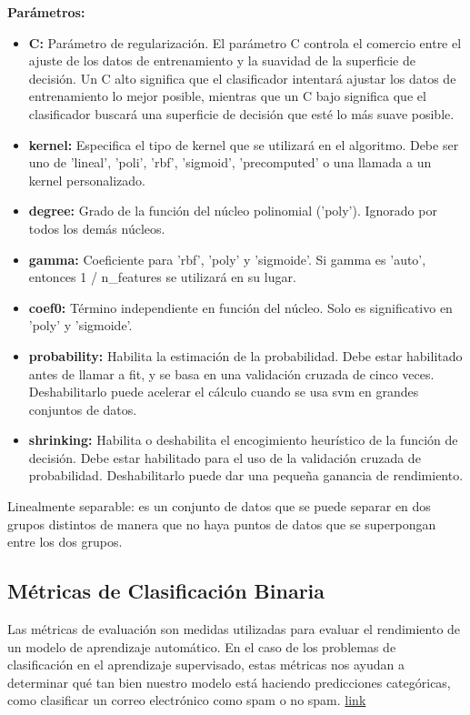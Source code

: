 \documentclass[../main.tex]{subfiles}
\begin{document}
            \textbf{Parámetros:}
            \begin{itemize}
                \item \textbf{C:} Parámetro de regularización. El parámetro C controla el comercio entre el ajuste de los datos de entrenamiento y la suavidad de la superficie de decisión. Un C alto significa que el clasificador intentará ajustar los datos de entrenamiento lo mejor posible, mientras que un C bajo significa que el clasificador buscará una superficie de decisión que esté lo más suave posible.
                \item \textbf{kernel:} Especifica el tipo de kernel que se utilizará en el algoritmo. Debe ser uno de 'lineal', 'poli', 'rbf', 'sigmoid', 'precomputed' o una llamada a un kernel personalizado.
                \item \textbf{degree:} Grado de la función del núcleo polinomial ('poly'). Ignorado por todos los demás núcleos.
                \item \textbf{gamma:} Coeficiente para 'rbf', 'poly' y 'sigmoide'. Si gamma es 'auto', entonces 1 / n\_features se utilizará en su lugar.
                \item \textbf{coef0:} Término independiente en función del núcleo. Solo es significativo en 'poly' y 'sigmoide'.
                \item \textbf{probability:} Habilita la estimación de la probabilidad. Debe estar habilitado antes de llamar a fit, y se basa en una validación cruzada de cinco veces. Deshabilitarlo puede acelerar el cálculo cuando se usa svm en grandes conjuntos de datos.
                \item \textbf{shrinking:} Habilita o deshabilita el encogimiento heurístico de la función de decisión. Debe estar habilitado para el uso de la validación cruzada de probabilidad. Deshabilitarlo puede dar una pequeña ganancia de rendimiento.
            \end{itemize}

            Linealmente separable: es un conjunto de datos que se puede separar en dos grupos distintos de manera que no haya puntos de datos que se superpongan entre los dos grupos.\\
            
    \subsection{Métricas de Clasificación Binaria}
        Las métricas de evaluación son medidas utilizadas para evaluar el rendimiento de un modelo de aprendizaje automático. En el caso de los problemas de clasificación en el aprendizaje supervisado, estas métricas nos ayudan a determinar qué tan bien nuestro modelo está haciendo predicciones categóricas, como clasificar un correo electrónico como spam o no spam. \href{https://www.themachinelearners.com/metricas-de-clasificacion/#Precision}{link}\\
        
\end{document}
